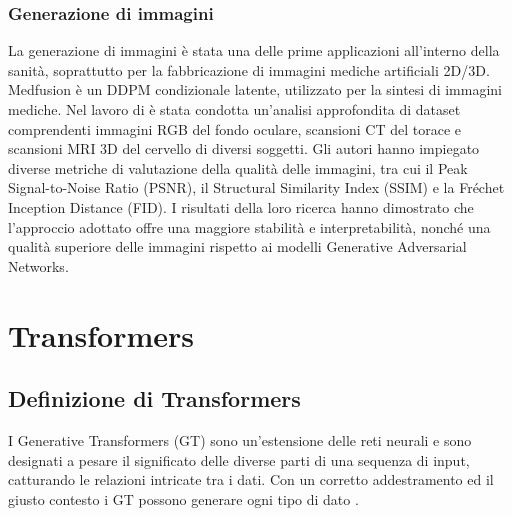 \subsubsection{Generazione di immagini}
La generazione di immagini è stata una delle prime applicazioni all'interno della sanità, soprattutto per la fabbricazione di immagini mediche artificiali 2D/3D.
Medfusion è un DDPM condizionale latente, utilizzato per la sintesi di immagini mediche. Nel lavoro di \cite{muller2023multimodal} è stata condotta un'analisi approfondita di dataset comprendenti immagini RGB del fondo oculare, scansioni CT del torace e scansioni MRI 3D del cervello di diversi soggetti. Gli autori hanno impiegato diverse metriche di valutazione della qualità delle immagini, tra cui il Peak Signal-to-Noise Ratio (PSNR), il Structural Similarity Index (SSIM) e la Fréchet Inception Distance (FID). I risultati della loro ricerca hanno dimostrato che l'approccio adottato offre una maggiore stabilità e interpretabilità, nonché una qualità superiore delle immagini rispetto ai modelli Generative Adversarial Networks.

\section{Transformers}
\subsection{Definizione di Transformers}
I Generative Transformers (GT) sono un'estensione delle reti neurali e sono designati a pesare il significato delle diverse parti di una sequenza di input, catturando le relazioni intricate tra i dati. Con un corretto addestramento ed il giusto contesto i GT possono generare ogni tipo di dato \cite{zhang2023turing}.
